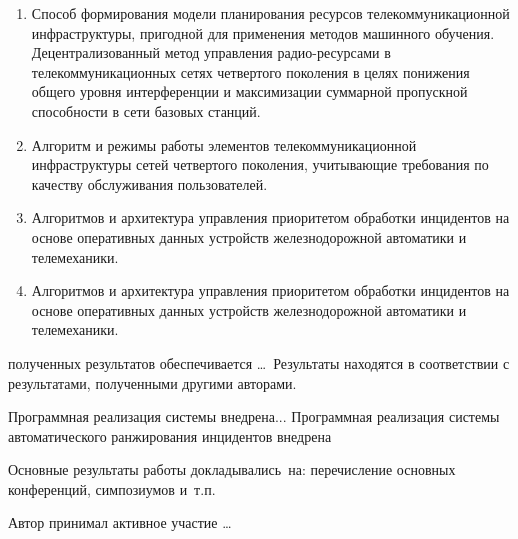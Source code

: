 {}
\begin{enumerate}
  \item Способ формирования модели планирования ресурсов телекоммуникационной инфраструктуры, пригодной для применения методов машинного обучения. Децентрализованный метод управления радио-ресурсами в телекоммуникационных сетях четвертого поколения в целях понижения общего уровня интерференции и максимизации суммарной пропускной способности в сети базовых станций.
  \item Алгоритм и режимы работы элементов телекоммуникационной инфраструктуры сетей четвертого поколения, учитывающие требования по  качеству обслуживания пользователей.
  \item Алгоритмов и архитектура управления приоритетом обработки инцидентов на основе оперативных данных устройств железнодорожной автоматики и телемеханики.
  \item Алгоритмов и архитектура управления приоритетом обработки инцидентов на основе оперативных данных устройств железнодорожной автоматики и телемеханики.
\end{enumerate}

{\reliability} полученных результатов обеспечивается \ldots \ Результаты находятся в соответствии с результатами, полученными другими авторами.



Программная реализация системы  внедрена... 
Программная реализация системы автоматического ранжирования инцидентов внедрена 

{\probation}
Основные результаты работы докладывались~на:
перечисление основных конференций, симпозиумов и~т.\:п.

{\contribution} Автор принимал активное участие \ldots


